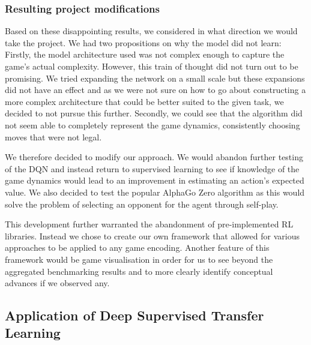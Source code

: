 \documentclass[12pt,a4paper]{article}
\begin{document}
\subsubsection{Resulting project modifications}
Based on these disappointing results, we considered in what direction we would take the project. We had two propositions on why the model did not learn: Firstly, the model architecture used was not complex enough to capture the game’s actual complexity. However, this train of thought did not turn out to be promising. We tried expanding the network on a small scale but these expansions did not have an effect and as we were not sure on how to go about constructing a more complex architecture that could be better suited to the given task, we decided to not pursue this further. Secondly, we could see that the algorithm did not seem able to completely represent the game dynamics, consistently choosing moves that were not legal.

We therefore decided to modify our approach. We would abandon further testing of the DQN and instead return to supervised learning to see if knowledge of the game dynamics would lead to an improvement in estimating an action’s expected value. We also decided to test the popular AlphaGo Zero algorithm as this would solve the problem of selecting an opponent for the agent through self-play. 

This development further warranted the abandonment of pre-implemented RL libraries. Instead we chose to create our own framework that allowed for various approaches to be applied to any game encoding. Another feature of this framework would be game visualisation in order for us to see beyond the aggregated benchmarking results and to more clearly identify conceptual advances if we observed any.


\subsection{Application of Deep Supervised Transfer Learning}
\end{document}
